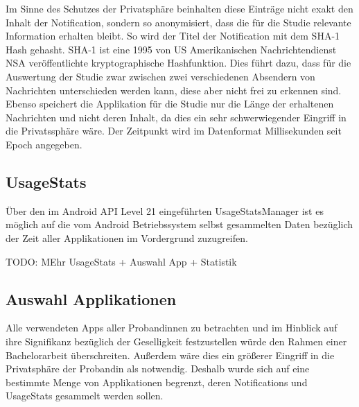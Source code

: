 Im Sinne des Schutzes der Privatsphäre beinhalten diese Einträge nicht exakt den Inhalt der Notification, sondern so anonymisiert, dass die für die Studie relevante Information erhalten bleibt.
So wird der Titel der Notification mit dem SHA-1 Hash\cite{sha1def} gehasht.
SHA-1 ist eine 1995 von US Amerikanischen Nachrichtendienst NSA veröffentlichte kryptographische Hashfunktion\cite{sha1proposal}.
Dies führt dazu, dass für die Auswertung der Studie zwar zwischen zwei verschiedenen Absendern von Nachrichten unterschieden werden kann, diese aber nicht frei zu erkennen sind.
Ebenso speichert die Applikation für die Studie nur die Länge der erhaltenen Nachrichten und nicht deren Inhalt, da dies ein sehr schwerwiegender Eingriff in die Privatssphäre wäre.
Der Zeitpunkt wird im Datenformat Millisekunden seit Epoch angegeben.


\subsection{UsageStats}

Über den im Android API Level 21 eingeführten UsageStatsManager ist es möglich 
auf die vom Android Betriebssystem selbst gesammelten Daten bezüglich der Zeit aller Applikationen im Vordergrund zuzugreifen.


TODO: MEhr UsageStats + Auswahl App + Statistik

\subsection{Auswahl Applikationen}

Alle verwendeten Apps aller Probandinnen zu betrachten und im Hinblick auf ihre Signifikanz bezüglich der Geselligkeit festzustellen würde den Rahmen einer Bachelorarbeit überschreiten.
Außerdem wäre dies ein größerer Eingriff in die Privatsphäre der Probandin als notwendig.
Deshalb wurde sich auf eine bestimmte Menge von Applikationen begrenzt, deren Notifications und UsageStats gesammelt werden sollen.


